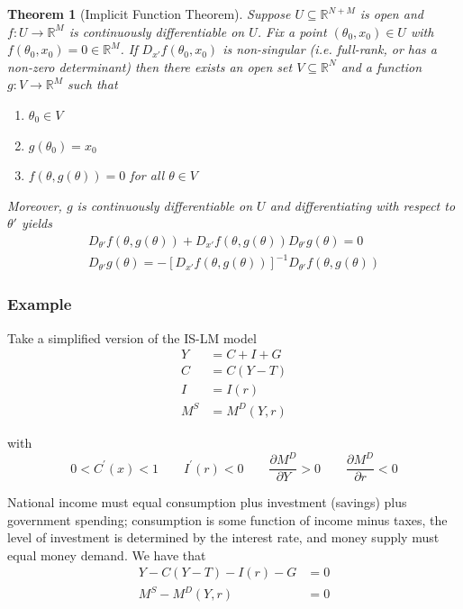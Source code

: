 \documentclass{article}
\newcommand{\R}{\mathbb{R}}
\theoremstyle{mythm}
\newtheorem{theorem}{Theorem}
\theoremstyle{mydef}
\begin{document}
\begin{theorem}[Implicit Function Theorem]

  Suppose $U\subseteq \R^{N+M}$ is open and $f:U\to \R^M$ is continuously differentiable on $U$. Fix a point $(\theta_0, x_0) \in U$ with $f(\theta_0, x_0) = 0 \in \R^M$. If $D_{x'}f(\theta_0, x_0)$ is non-singular (i.e. full-rank, or has a non-zero determinant) then there exists an open set $V\subseteq \R^N$ and a function $g:V\to \R^M$ such that 
  \begin{enumerate}
      \item $\theta_0 \in V$
      \item $g(\theta_0) = x_0$ 
      \item $f(\theta, g(\theta)) = 0$ for all $\theta \in V$
  \end{enumerate}
  Moreover, $g$ is continuously differentiable on $U$ and differentiating with respect to $\theta'$ yields
  \begin{align*}
      D_{\theta'}f(\theta, g(\theta)) + D_{x'} f(\theta, g(\theta)) D_{\theta'}g(\theta) = 0 \\
      D_{\theta'}g(\theta) = -\left[D_{x'} f(\theta, g(\theta))\right]^{-1}D_{\theta'}f(\theta, g(\theta))
  \end{align*}
\end{theorem}

\subsubsection{Example}
\label{ssub:example}

Take a simplified version of the IS-LM model
\begin{align*}
  Y   & = C + I + G   \\
  C   & = C(Y - T)    \\
  I   & = I(r)        \\
  M^S & = M^D(Y, r)
\end{align*}

with
\[
  0 < C^\prime(x) < 1
  \quad\quad
  I^\prime(r) < 0
  \quad\quad
  \dfrac{\partial M^D}{\partial Y} > 0
  \quad\quad
  \dfrac{\partial M^D}{\partial r} < 0
\]

National income must equal consumption plus investment (savings) plus government spending; consumption is some function of income minus taxes, the level of investment is determined by the interest rate, and money supply must equal money demand.  We have that
\begin{align*}
  Y - C(Y - T) - I(r) - G & = 0 \\
  M^S - M^D (Y, r)        & = 0
\end{align*}
\end{document}

